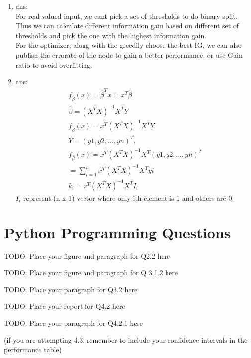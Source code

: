 \documentclass[12pt]{article}
\begin{document}
\begin{enumerate}
\item ans:\\
  For real-valued input, we cant pick a set of thresholds to do binary split. Thus we can calculate different information gain 
  based on different set of thresholds and pick the one with the highest information gain.\\
  For the optimizer, along with the greedily choose the best IG, we can also publish the errorate of the node to gain a better performance, or use Gain ratio to avoid overfitting.\\
\item ans:\\
\begin{gather*} 
  f_{\hat{\beta}}(x) = \hat{\beta}^T x  = x ^ T \hat{\beta} \\
  \hat{\beta} = (X^T X)^{-1} X^T Y \\
  f_{\hat{\beta}}(x) = x^T (X^T X)^{-1} X^T Y \\
  Y = (y1, y2, ..., yn)^T,  \\
  f_{\hat{\beta}}(x) = x^T (X^T X)^{-1} X^T (y1, y2, ..., yn)^T \\
  = \sum_{i=1}^n x^T (X^T X)^{-1} X^T yi \\
  k_i = x^T (X^T X)^{-1} X^T I_i
\end{gather*}
$I_i$ represent (n x 1) vector where only ith element is 1 and others are 0.
 
\end{enumerate}

\section{Python Programming Questions}


TODO: Place your figure and paragraph for Q2.2 here

\vspace{4mm}
\noindent
TODO: Place your figure and paragraph for Q 3.1.2 here

\vspace{4mm}
\noindent
TODO: Place your paragraph for Q3.2 here

\vspace{4mm}
\noindent
TODO: Place your report for Q4.2 here 

\vspace{4mm}
\noindent
TODO: Place your paragraph for Q4.2.1 here 

\vspace{4mm}
\noindent
(if you are attempting 4.3, remember to include your confidence intervals in the performance table)
\end{document}
